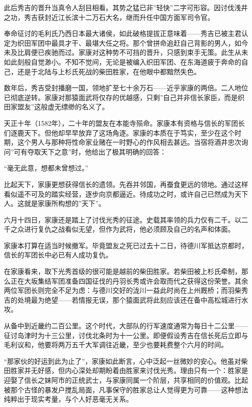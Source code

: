 \documentclass[
]{book}
\begin{document}
此后秀吉的晋升当真令人刮目相看。其势之猛已非''轻快''二字可形容。因讨伐浅井之功，秀吉获封近江长滨十二万石大名，继而升任中国方面军司令官。

奉命征讨的毛利氏乃西日本最大诸侯，如此破格提拔正意味着------秀吉已被主君认定为织田军团中最具才干、最堪大任之将。那个曾拼命追赶自己背影的男人，如今未及比肩便已疾驰而过。家康对这种势不可挡的晋升，只感到束手无策。此生从未如此刻般自觉渺小。不知不觉间，无论是被编入织田军团、在东海道疲于奔命的自己，还是于北陆与上杉氏死战的柴田胜家，在他眼中都黯然失色。

数年后，秀吉受封播磨一国，领地扩至七十余万石------近乎家康的两倍。二人地位已彻底逆转。家康对那猿面武将仅存的优越感，只剩''自己并非信长家臣，而是织田家盟友''这般虚无缥缈的名义了。

天正十年（1582年），二十年的盟友在本能寺殒命。家康本有资格与信长的军团长们逐鹿天下。但他却早早放弃了这场角逐。家康的本质在于笃实，至少在这个时期，这个男人与那种将性命家业赌在一时野心的作风相去甚远。当宿将酒井忠次询问''可有夺取天下之意''时，他给出了极其明确的回答：

``毫无此意，想都未曾想过。''

比起天下，家康更想获得信长的遗领。先吞并邻国，再蚕食更远的领地。通过这样看似遥不可及的踏实经营，逐步向京都逼近。待成功之时，或许自己已然成为天下人。这就是家康所构想的''天下''。

六月十四日，家康还是踏上了讨伐光秀的征途。史载其率领的兵力仅有二千。以二千之众进行复仇之战看似无望，但作为武将，他必须顾及自己的名声和体面。

家康本打算在适当时候撤军。毕竟盟友之死已过去十二日，待德川军抵达京都时，信长的军团长中必已有人成功复仇。

在家康看来，取下光秀首级的很可能是越前的柴田胜家。若柴田被上杉氏牵制，那么正在大坂集结军团准备四国征伐的丹羽长秀或许会取而代之获得这份荣誉。其余两位军团长则完全不足为虑：与德川交好的泷川一益此时尚在上州厩桥；而羽柴秀吉的处境最为绝望------若情报无误，那个猿面武将此刻应该还在备中高松城进行水攻。

从备中到近畿约二百公里。这个时代，大部队的行军速度通常为每日十二公里------征讨岛津时为十三公里，讨伐北条时为十一公里。即便假设秀吉在信长死后立即与毛利议和，他要将两万五千大军调往近畿，至少也要耗费整个六月的时间。

``那家伙的好运到此为止了''，家康如此断言，心中泛起一丝微妙的安心。他虽对柴田胜家并无好感，但内心深处却期盼着由胜家来讨伐光秀。理由只有一个：胜家是迎娶了信长之妹阿市的正统武士，与家康同属一个阶层，共享相同的价值观。比起被那个古怪的暴发户搅乱局面，凡事保守的胜家总让人觉得更为可靠------这种想法纯粹出于现实考量，与个人好恶毫无关系。
\end{document}
